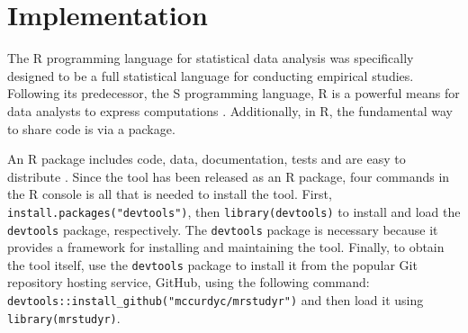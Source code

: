\section{Implementation}

The R programming language for statistical data analysis was specifically designed to
be a full statistical language for conducting empirical studies. Following its predecessor, the S programming
language, R is a powerful means for data analysts to express computations \cite{ihaka1996r}.
Additionally, in R, the fundamental way to share code is via a package.

An R package includes code, data, documentation, tests and are easy to distribute \cite{wickham2015r}.
Since the \mr tool has been released as an R package, four commands in the R console
is all that is needed to install the tool.
First, \texttt{install.packages("devtools")}, then \texttt{library(devtools)}
to install and load the \texttt{devtools}\cite{devtools} package, respectively.
The \texttt{devtools} package is necessary because it provides a framework for installing
and maintaining the tool. Finally, to obtain the
\mr\cite{mrstudyr} tool itself, use the \texttt{devtools} package to install it
from the popular Git repository hosting service, GitHub\cite{github},
using the following command: {\small\texttt{devtools::install\_github("mccurdyc/mrstudyr")}}
and then load it using \texttt{library(mrstudyr)}.





\newpage

